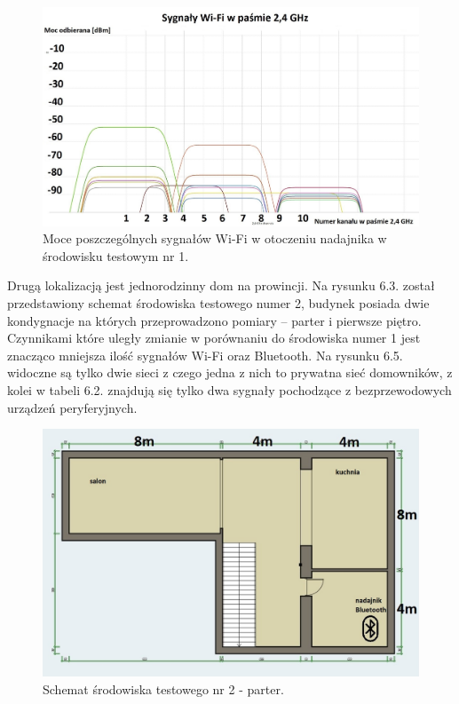 \documentclass[12pt, twoside, openany]{mwrep}
\begin{document}
\begin{figure}[H]
\centering
\includegraphics[scale=0.35]{2,4Ghz}
\caption{Moce poszczególnych sygnałów Wi-Fi w otoczeniu nadajnika w środowisku testowym nr 1.}
\end{figure}
\par
Drugą lokalizacją jest jednorodzinny dom na prowincji. Na rysunku 6.3. został przedstawiony schemat środowiska testowego numer 2, budynek posiada dwie kondygnacje na których przeprowadzono pomiary – parter i pierwsze piętro. Czynnikami które uległy zmianie w porównaniu do środowiska numer 1 jest znacząco mniejsza ilość sygnałów Wi-Fi oraz Bluetooth. Na rysunku 6.5. widoczne są tylko dwie sieci z czego jedna z nich to prywatna sieć domowników, z kolei w tabeli 6.2. znajdują się tylko dwa sygnały pochodzące z bezprzewodowych urządzeń peryferyjnych.
\par
\begin{figure}[H]
\centering
\includegraphics[scale=0.4]{dom1pietro}
\caption{Schemat środowiska testowego nr 2 - parter.}
\end{figure}
\end{document}
